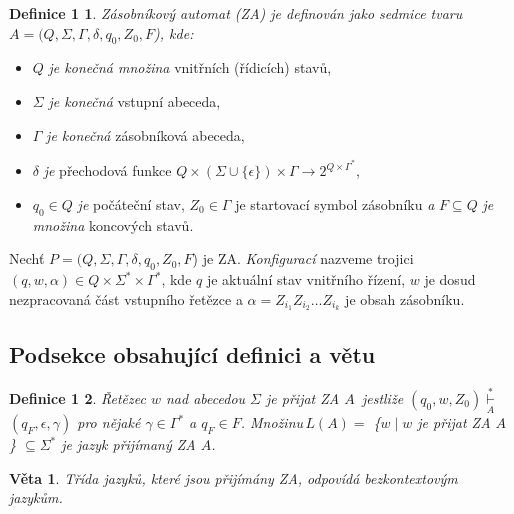 \documentclass[a4paper, 11pt, twocolumn]{article}
\begin{document}
    \newtheorem*{definition}{Definice 1}
        \begin{definition}
            \label{def:1}
            \emph{Zásobníkový automat} (ZA) je definován jako sedmice tvaru $A = (Q, \Sigma, \Gamma, \delta, q_0, Z_0, F$), kde:
        \end{definition}
            \begin{itemize}
                \item $Q$ \textit{je konečná množina} vnitřních (řídicích) stavů,
                \item $\Sigma$ \textit{je konečná} vstupní abeceda,
                \item $\Gamma$ \textit{je konečná} zásobníková abeceda,
                \item $\delta$ \emph{je} přechodová funkce $Q \times (\Sigma \cup \{\epsilon\}) \times  \Gamma \rightarrow  2^{Q\times\Gamma ^\ast}$,
                \item $q_0 \in  Q$ \emph{je} počáteční stav, $Z_0 \in \Gamma$  je startovací symbol zásobníku \emph{a} $F \subseteq Q$ \emph{je množina} koncových stavů.
            \end{itemize}
            \par Nechť $P = (Q, \Sigma, \Gamma, \delta, q_0, Z_0, F$) je ZA. \emph{Konfigurací} nazveme trojici $(q, w, \alpha) \in Q \times \Sigma^\ast \times\Gamma^\ast$, kde $q$ je aktuální stav vnitřního řízení, $w$ je dosud nezpracovaná část vstupního řetězce a $\alpha = Z_{i_1}Z_{i_2} \ldots Z_{i_k} $ je obsah zásobníku.
            \subsection{Podsekce obsahující definici a větu}
            \begin{definition}
                \label{def:2}
                \emph{Řetězec} $w$ \emph{nad abecedou} $\Sigma$ \emph{je přijat ZA} $A$~jestliže $(q_0, w, Z_0) \underset{A}{\overset{\ast}{\vdash}}$~$(q_F, \epsilon, \gamma)$ pro nějaké $\gamma \in \Gamma^\ast$ a $q_F \in F$. 
                Množinu\,$L(A) =$ \{$w\;|\;w$ je přijat ZA $A$\} $\subseteq \Sigma^\ast $ je \emph{jazyk přijímaný ZA} $A$.
            \end{definition}
    \newtheorem{veta}{Věta}
    \begin{veta}
    Třída jazyků, které jsou přijímány ZA, odpovídá \emph{bezkontextovým jazykům.}
    \end{veta}
\end{document}
